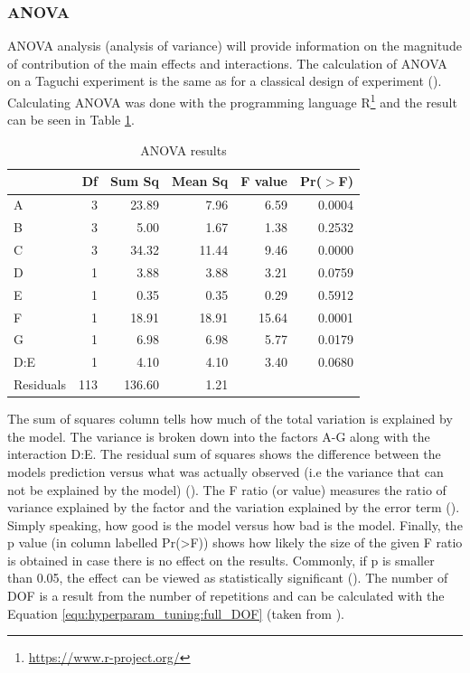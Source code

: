 \subsubsection{ANOVA}
ANOVA analysis (analysis of variance) will provide information on the magnitude of contribution of the main effects and interactions. The calculation of ANOVA on a Taguchi experiment is the same as for a classical design of experiment (\cite{yang_design_2009}). Calculating ANOVA was done with the programming language R\footnote{\href{https://www.r-project.org/}{https://www.r-project.org/}} and the result can be seen in Table \ref{tab:taguchi:anova_results}.

\begin{table}[ht]
	\centering
	\begin{tabular}{lrrrrr}
		\hline
		& Df & Sum Sq & Mean Sq & F value & Pr($>$F) \\ 
		\hline
		A & 3 & 23.89 & 7.96 & 6.59 & 0.0004 \\ 
		B & 3 & 5.00 & 1.67 & 1.38 & 0.2532 \\ 
		C & 3 & 34.32 & 11.44 & 9.46 & 0.0000 \\ 
		D & 1 & 3.88 & 3.88 & 3.21 & 0.0759 \\ 
		E & 1 & 0.35 & 0.35 & 0.29 & 0.5912 \\ 
		F & 1 & 18.91 & 18.91 & 15.64 & 0.0001 \\ 
		G & 1 & 6.98 & 6.98 & 5.77 & 0.0179 \\ 
		D:E & 1 & 4.10 & 4.10 & 3.40 & 0.0680 \\ 
		Residuals & 113 & 136.60 & 1.21 &  &  \\ 
		\hline
	\end{tabular}
	\caption{ANOVA results}
	\label{tab:taguchi:anova_results}
\end{table}

The sum of squares column tells how much of the total variation is explained by the model. The variance is broken down into the factors A-G along with the interaction D:E. The residual sum of squares shows the difference between the models prediction versus what was actually observed (i.e the variance that can not be explained by the model) (\cite{field_discovering_2012}). The F ratio (or value) measures the ratio of variance explained by the factor and the variation explained by the error term (\cite{field_discovering_2012}). Simply speaking, how good is the model versus how bad is the model. Finally, the p value (in column labelled Pr(>F)) shows how likely the size of the given F ratio is obtained in case there is no effect on the results. Commonly, if p is smaller than 0.05, the effect can be viewed as statistically significant (\cite{field_discovering_2012}). The number of DOF is a result from the number of repetitions and can be calculated with the Equation \ref{equ:hyperparam_tuning:full_DOF} (taken from \cite{roy_primer_1990}).

